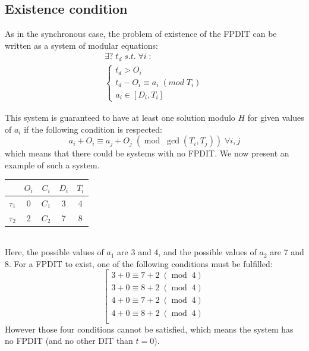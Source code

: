 \documentclass[times, 10pt,twocolumn, a4paper]{article}
\begin{document}
	\subsection{Existence condition}
  \label{sct:FPDITexist}
		As in the synchronous case, the problem of existence of the FPDIT
		can be written as a system of modular equations:
		\[
			\begin{array}{l}
				\exists ? \; t_d \; s.t. \; \forall i \; :\\
				\left\{
					\begin{array}{l}
						t_d > O_i \\
						t_d - O_i \equiv a_i \; (mod \; T_i) \\
						a_i \in [D_i, T_i]
					\end{array}
				\right.
			\end{array}
		\]

		This system is guaranteed to have at least one solution modulo $H$ for given
		values of $a_i$ if the following condition is respected:
		\[
			a_i + O_i \equiv a_j + O_j \; (\operatorname{mod} \; \operatorname{gcd}(T_i,
			T_j)) \; \forall i,j
		\]
		which means that there could be systems with no FPDIT.
		We now present an example of such a system.\\

		\begin{center}
		\begin{tabular}{|r|c|c|c|c|}
		 \hline
		  & $O_i$ & $C_i$ & $D_i$ & $T_i$ \\
		 \hline
		 $\tau_1$ & 0 & $C_1$ & 3 & 4\\
		 \hline
		 $\tau_2$ & 2 & $C_2$ & 7 & 8\\
		 \hline
		\end{tabular}
		\end{center}
		~\\

		Here, the possible values of $a_1$ are 3 and 4, and the possible values
		of $a_2$ are 7 and 8. For a FPDIT to exist, one of the following
		conditions must be fulfilled:
		\[
		\left[
		\begin{array}{c}
			3 + 0 \equiv 7 + 2 \; (\operatorname{mod} \; 4 ) \\
			3 + 0 \equiv 8 + 2 \; (\operatorname{mod} \; 4 ) \\
			4 + 0 \equiv 7 + 2 \; (\operatorname{mod} \; 4 ) \\
			4 + 0 \equiv 8 + 2 \; (\operatorname{mod} \; 4 ) \\
		\end{array}
		\right.
		\]
		However those four conditions cannot be satisfied, which means the system has
		no FPDIT (and no other DIT than $t=0$).
\end{document}
